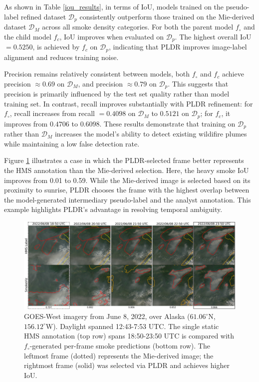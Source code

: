 \documentclass{article}
\begin{document}
As shown in Table \ref{iou_results}, in terms of IoU, models trained on the pseudo-label refined dataset \(\mathcal{D}_p\) consistently outperform those trained on the Mie-derived dataset \( \mathcal{D}_M \) across all smoke density categories. For both the parent model \(f_{\circ}\) and the child model \(f_c\), IoU improves when evaluated on \(\mathcal{D}_p\). The highest overall IoU \(= 0.5250 \), is achieved by \( f_c \) on \( \mathcal{D}_p \), indicating that PLDR improves image-label alignment and reduces training noise.

Precision remains relatively consistent between models, both \( f_{\circ} \) and \( f_c \) achieve precision \(\approx 0.69 \) on \( \mathcal{D}_M \), and precision \(\approx 0.79 \) on \( \mathcal{D}_p \). This suggests that precision is primarily influenced by the test set quality rather than model training set. In contrast, recall improves substantially with PLDR refinement: for \( f_{\circ}\), recall increases from recall \( = 0.4098 \) on \( \mathcal{D}_M \) to \( 0.5121 \) on \( \mathcal{D}_p \); for \( f_c \), it improves from \( 0.4706 \) to \( 0.6098 \). These results demonstrate that training on \(\mathcal{D}_p\) rather than \(\mathcal{D}_M\) increases the model’s ability to detect existing wildifire plumes while maintaining a low false detection rate.


Figure \ref{ml_vs_mei} illustrates a case in which the PLDR-selected frame better represents the HMS annotation than the Mie-derived selection. Here, the heavy smoke IoU improves from 0.01 to 0.59. While the Mie-derived image is selected based on its proximity to sunrise, PLDR chooses the frame with the highest overlap between the model-generated intermediary pseudo-label and the analyst annotation. This example highlights PLDR’s advantage in resolving temporal ambiguity.

\begin{figure}[!htb] 
    \centering
    \includegraphics[width=\linewidth]{figures/final_results_small.png}
        \caption{GOES-West imagery from June 8, 2022, over Alaska (\(61.06^{\circ}\)N, \(156.12^{\circ}\)W). Daylight spanned 12:43-7:53 UTC. The single static HMS annotation (top row) spans 18:50-23:50 UTC is compared with \(f_{\circ}\)-generated per-frame smoke predictions (bottom row). The leftmost frame (dotted) represents the Mie-derived image; the rightmost frame (solid) was selected via PLDR and achieves higher IoU.}

    \label{ml_vs_mei}
\end{figure}
\end{document}
